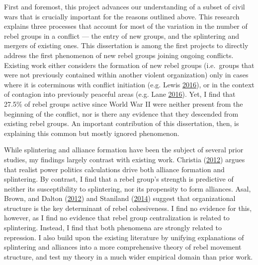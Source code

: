 \documentclass[12pt,]{book}
\theoremstyle{definition}
\theoremstyle{definition}
\theoremstyle{remark}
\begin{document}
First and foremost, this project advances our understanding of a subset
of civil wars that is crucially important for the reasons outlined
above. This research explains three processes that account for most of
the variation in the number of rebel groups in a conflict --- the entry
of new groups, and the splintering and mergers of existing ones. This
dissertation is among the first projects to directly address the first
phenomenon of new rebel groups joining ongoing conflicts. Existing work
either considers the formation of new rebel groups (i.e.~groups that
were not previously contained within another violent organization) only
in cases where it is coterminous with conflict initiation (e.g. Lewis
\protect\hyperlink{ref-Lewis2016}{2016}), or in the context of contagion
into previously peaceful areas (e.g. Lane
\protect\hyperlink{ref-Lane2016}{2016}). Yet, I find that 27.5\% of
rebel groups active since World War II were neither present from the
beginning of the conflict, nor is there any evidence that they descended
from existing rebel groups. An important contribution of this
dissertation, then, is explaining this common but mostly ignored
phenomenon.

While splintering and alliance formation have been the subject of
several prior studies, my findings largely contrast with existing work.
Christia (\protect\hyperlink{ref-Christia2012}{2012}) argues that
realist power politics calculations drive both alliance formation and
splintering. By contrast, I find that a rebel group's strength is
predictive of neither its susceptibility to splintering, nor its
propensity to form alliances. Asal, Brown, and Dalton
(\protect\hyperlink{ref-Asal2012}{2012}) and Staniland
(\protect\hyperlink{ref-Staniland2014}{2014}) suggest that
organizational structure is the key determinant of rebel cohesiveness. I
find no evidence for this, however, as I find no evidence that rebel
group centralization is related to splintering. Instead, I find that
both phenomena are strongly related to repression. I also build upon the
existing literature by unifying explanations of splintering and
alliances into a more comprehensive theory of rebel movement structure,
and test my theory in a much wider empirical domain than prior work.
\end{document}
